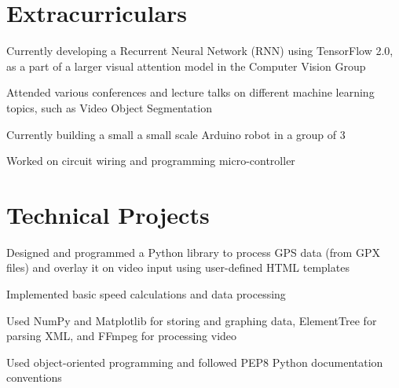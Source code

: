 \begin{minipage}[t]{0.66\textwidth}

\section{Extracurriculars}
\begin{tightitemize}
\item Currently developing a Recurrent Neural Network (RNN) using TensorFlow 2.0, as a part of a larger visual attention model in the Computer Vision Group
\item Attended various conferences and lecture talks on different machine learning topics, such as Video Object Segmentation
\end{tightitemize}
\sectionspace %


\begin{tightitemize}
\item Currently building a small a small scale Arduino robot in a group of 3
\item Worked on circuit wiring and programming micro-controller
\end{tightitemize}
\sectionspace %


\section{Technical Projects}

\descript{ } %
\begin{tightitemize}
\item Designed and programmed a Python library to process GPS data (from GPX files) and overlay it on video input using user-defined HTML templates
\item Implemented basic speed calculations and data processing
\item Used NumPy and Matplotlib for storing and graphing data, ElementTree for parsing XML, and FFmpeg for processing video
\item Used object-oriented programming and followed PEP8 Python documentation conventions
\end{tightitemize}


\end{minipage}
